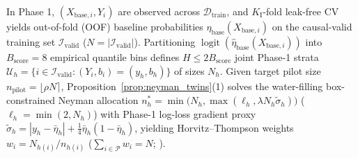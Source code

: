 \documentclass[11pt]{article}
\theoremstyle{remark}
\begin{document}
In Phase 1, $(X_{\text{base},i}, Y_i)$ are observed across $\mathcal{D}_{\text{train}}$, and $K_{\text{I}}$-fold leak-free CV yields out-of-fold (OOF) baseline probabilities $\hat{\eta}_{\text{base}}(X_{\text{base},i})$ on the causal-valid training set $\mathcal{I}_{\text{valid}}$ ($N = |\mathcal{I}_{\text{valid}}|$). Partitioning $\operatorname{logit}(\hat{\eta}_{\text{base}}(X_{\text{base},i}))$ into $B_{\text{score}} = 8$ empirical quantile bins defines $H \le 2 B_{\text{score}}$ joint Phase-1 strata $\mathcal{U}_h = \{i \in \mathcal{I}_{\text{valid}} : (Y_i, b_i) = (y_h, b_h)\}$ of sizes $N_h$. Given target pilot size $n_{\text{pilot}} = \lfloor \rho N \rceil$, Proposition~\ref{prop:neyman_twins}(1) solves the water-filling box-constrained Neyman allocation $n_h^* = \min\!\big(N_h, \max(\ell_h, \lambda N_h \tilde{\sigma}_h)\big)$ ($\ell_h = \min(2, N_h)$) with Phase-1 log-loss gradient proxy $\tilde{\sigma}_h = |y_h - \bar{\eta}_h| + \tfrac{1}{4}\bar{\eta}_h(1 - \bar{\eta}_h)$, yielding Horvitz--Thompson weights $w_i = N_{h(i)} / n_{h(i)}$ ($\sum_{i \in \mathcal{P}} w_i = N$; \citealp{horvitz1952generalization,lumley2010complex}).
\end{document}
